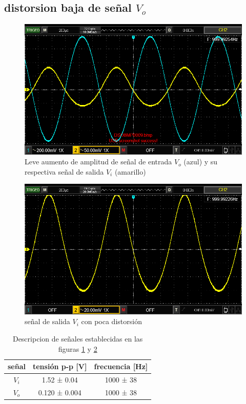 \documentclass[12pt, a4paper]{article}
\begin{document}
    \subsection{distorsion baja de señal $V_o$}

    \begin{figure}[h!]
        \centering
        \includegraphics[height=6cm\textwidth]{p24ViVo.png}
        \caption{Leve aumento de amplitud de señal de entrada $V_o$ (azul) y su respectiva señal de salida $V_i$ (amarillo)}
        \label{fig:disViVo}
    \end{figure}

    \newpage

    \begin{figure}[h!]
        \centering
        \includegraphics[height=6cm\textwidth]{p24Vo.png}
        \caption{señal de salida $V_i$ con poca distorsión}
        \label{fig:disVi}
    \end{figure}

    \begin{table}[h!]
        \centering
        \caption{Descripcion de señales establecidas en las figuras \ref{fig:disViVo} y \ref{fig:disVi}}
        \label{tab:p24}
        \begin{tabular}{|c|c|c|} \hline
            señal  &  tensión p-p [V] & frecuencia [Hz] \\ \hline
            $V_i$  &  1.52 ± 0.04 &  1000 ± 38  \\
            $V_o$  &  0.120 ± 0.004 &  1000 ± 38  \\ \hline
        \end{tabular}
    \end{table}
\end{document}
